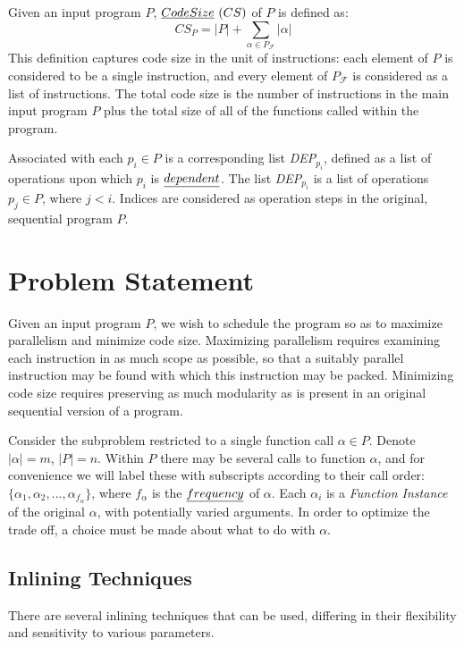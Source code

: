 \documentclass[12pt,twoside]{article}
\begin{document}
\begin{definition} Given an input program $P$, $\emph{Code Size} \ (CS)$ of $P$ is defined as:
	\begin{equation}
		CS_P = |P| + \sum_{\alpha \in P_{\mathcal{F}}} |\alpha| 
	\end{equation}
	This definition captures code size in the unit of instructions: each element of $P$ is considered to be a single instruction, and every element of $P_{\mathcal{F}}$ is considered as a list of instructions. The total code size is the number of instructions in the main input program $P$ plus the total size of all of the functions called within the program.
\end{definition}

\begin{definition} Associated with each $p_i \in P$ is a corresponding list \emph{DEP}$_{p_i}$, defined as a list of operations upon which $p_i$ is $\emph{dependent}$. The list \emph{DEP}$_{p_i}$ is a list of operations $p_j \in P$, where $j < i$. Indices are considered as operation steps in the original, sequential program $P$.
\end{definition}

\section{Problem Statement}
Given an input program $P$, we wish to schedule the program so as to maximize parallelism and minimize code size. Maximizing parallelism requires examining each instruction in as much scope as possible, so that a suitably parallel instruction may be found with which this instruction may be packed. Minimizing code size requires preserving as much modularity as is present in an original sequential version of a program. 

Consider the subproblem restricted to a single function call $\alpha \in P$. Denote $|\alpha| = m$, $|P| = n$. Within $P$ there may be several calls to function $\alpha$, and for convenience we will label these with subscripts according to their call order: $\{\alpha_1, \alpha_2, ... , \alpha_{f_{\alpha}}\}$, where $f_{\alpha}$ is the $\emph{frequency}$ of $\alpha$. Each $\alpha_i$ is a \emph{Function Instance} of the original $\alpha$, with potentially varied arguments. In order to optimize the trade off, a choice must be made about what to do with $\alpha$.

\subsection{Inlining Techniques}
There are several inlining techniques that can be used, differing in their flexibility and sensitivity to various parameters. 
\end{document}
